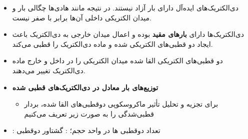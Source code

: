 \ELhold


\begin{ELunit}

\begin{itemize}
\tightlist
\item
  دی‌الکتریک‌های ایده‌آل دارای بار آزاد نیستند. در نتیجه مانند هادی‌ها چگالی بار و میدان الکتریکی داخلی آن‌ها برابر با صفر نیست.
\item
  دی‌الکتریک‌ها دارای \textbf{بارهای مقید} بوده و اعمال میدان خارجی به دی‌الکتریک باعث ایجاد دو قطبی‌های الکتریکی شده و ماده دی‌الکتریک را قطبی می‌کند.
\item
  دو قطبی‌های الکتریکی القا شده میدان الکتریکی را در داخل و خارج ماده دی‌الکتریک تغییر می‌دهند.
\end{itemize}


\begin{itemize}
\tightlist
\item
  \textbf{توزیع‌های بار معادل در دی‌الکتریک‌های قطبی شده}

  \begin{itemize}
  \tightlist
  \item
    برای تجزیه و تحلیل تأثیر ماکروسکوپی دوقطبی‌های القا شده، بردار قطبی‌شدگی  را به صورت زیر تعریف می‌کنیم
  \end{itemize}
\end{itemize}

\end{ELunit}

\begin{ELdefinition}{}


\begin{itemize}
\tightlist
\item
  : تعداد دوقطبی ها در واحد حجم؛ : گشتاور دوقطبی
\end{itemize}

\end{ELdefinition}

